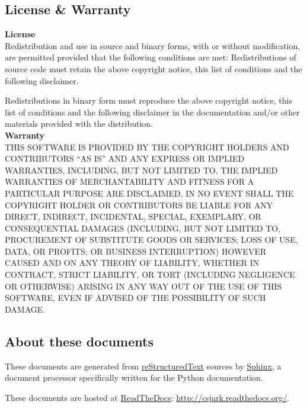 \documentclass[A4paper,10pt,english]{sphinxmanual}
\begin{document}
\subsection{License \& Warranty}

\label{other/license:license-warranty}\label{other/license:license}

\textbf{License}\\

Redistribution and use in source and binary forms, with or without
modification, are permitted provided that the following conditions are met:
Redistributions of source code must retain the above copyright notice, this list of conditions and the following disclaimer.

Redistributions in binary form must reproduce the above copyright notice, this list of conditions and the following disclaimer in the documentation and/or other materials provided with the distribution.
\\

\textbf{Warranty}\\

THIS SOFTWARE IS PROVIDED BY THE COPYRIGHT HOLDERS AND CONTRIBUTORS ``AS IS'' AND ANY EXPRESS OR IMPLIED WARRANTIES, INCLUDING, BUT NOT LIMITED TO, THE IMPLIED WARRANTIES OF MERCHANTABILITY AND FITNESS FOR A PARTICULAR PURPOSE ARE DISCLAIMED. IN NO EVENT SHALL THE COPYRIGHT HOLDER OR CONTRIBUTORS BE LIABLE FOR ANY DIRECT, INDIRECT, INCIDENTAL, SPECIAL, EXEMPLARY, OR CONSEQUENTIAL DAMAGES (INCLUDING, BUT NOT LIMITED TO, PROCUREMENT OF SUBSTITUTE GOODS OR SERVICES; LOSS OF USE, DATA, OR PROFITS; OR BUSINESS INTERRUPTION) HOWEVER CAUSED AND ON ANY THEORY OF LIABILITY, WHETHER IN CONTRACT, STRICT LIABILITY, OR TORT (INCLUDING NEGLIGENCE OR OTHERWISE) ARISING IN ANY WAY OUT OF THE USE
OF THIS SOFTWARE, EVEN IF ADVISED OF THE POSSIBILITY OF SUCH DAMAGE.


\subsection{About these documents}
\label{other/about::doc}\label{other/about:about-these-documents}
These documents are generated from \href{http://docutils.sf.net/rst.html}{reStructuredText} sources by \href{http://sphinx.pocoo.or}{Sphinx}, a
document processor specifically written for the Python documentation.

These documents are hosted at \href{http://www.readthedocs.org/}{ReadTheDocs}:
\href{http://csjark.readthedocs.org/}{http://csjark.readthedocs.org/}.
\end{document}
